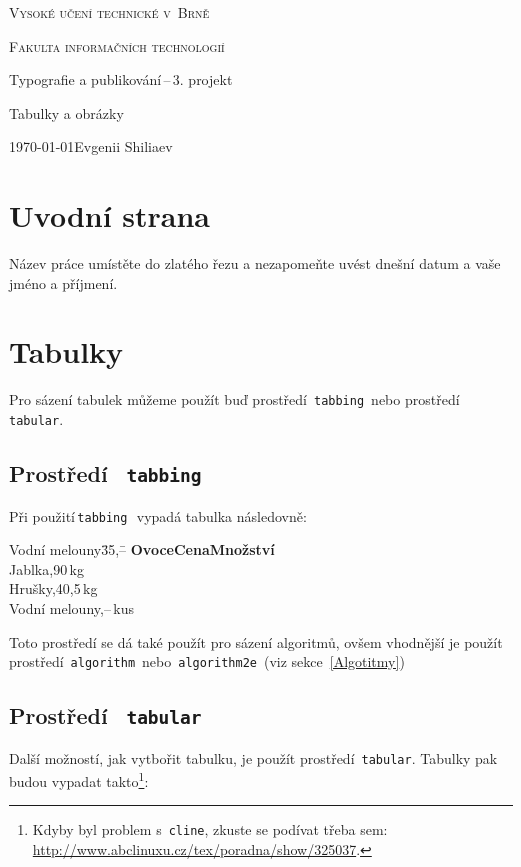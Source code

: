 \documentclass[a4paper, 11pt]{article}
\begin{document}
\begin{titlepage}
	\begin{center}
		\Huge
		\textsc{Vysoké učení technické v~Brně}

		\huge
		\textsc{Fakulta informačních technologií}


		\LARGE
		Typografie a publikování\,–\,3. projekt

		\Huge
		Tabulky a obrázky


		\Large
		\today \hfill Evgenii Shiliaev

	\end{center}
\end{titlepage}

\section{Uvodní strana}\label{Uvod}
Název práce umístěte do zlatého řezu a nezapomeňte uvést dnešní datum a vaše jméno a příjmení.

\section{Tabulky}\label{Tabulky}
Pro sázení tabulek můžeme použít buď prostředí\, \verb|tabbing|\, nebo prostředí\, \verb|tabular|.
\subsection{Prostředí \texttt{ tabbing}}
Při použití\,\verb|tabbing|\,\ vypadá tabulka následovně:
\begin{tabbing}
	Vodní melouny\quad\=35,--\qquad\= \kill
	\textbf{Ovoce}\>\textbf{Cena}\>\textbf{Množství}\\
	Jablka,90\,kg\\
	Hrušky,40,5\,kg\\
	Vodní melouny,--\,kus
\end{tabbing}
\bigskip
Toto prostředí se dá také použít pro sázení algoritmů, ovšem vhodnější je použít prostředí \,\verb|algorithm|\, nebo\, \verb|algorithm2e|\, (viz sekce~\ref{Algotitmy})

\subsection{Prostředí \texttt{ tabular}}
Další možností, jak vytbořit tabulku, je použít prostředí\, \verb|tabular|. Tabulky pak budou vypadat takto\footnote{Kdyby byl problem s~\texttt{cline}, zkuste se podívat třeba sem: \url{http://www.abclinuxu.cz/tex/poradna/show/325037}.}:
\end{document}
